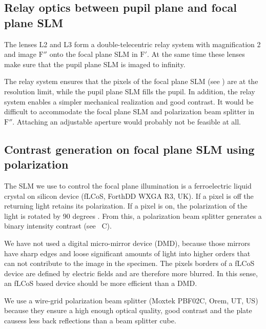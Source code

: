 

\subsection{Relay optics between pupil plane and focal plane SLM}
The lenses L2 and L3 form a double-telecentric relay system with
magnification 2 and image $\textrm{F}''$ onto the focal plane SLM in
$\textrm{F}'$. At the same time these lenses make sure that the pupil
plane SLM is imaged to infinity.
 
The relay system ensures that the pixels of the focal plane SLM (see
) are at the resolution limit, while the pupil
plane SLM fills the pupil.  In addition, the relay system enables a
simpler mechanical realization and good contrast. It would be
difficult to accommodate the focal plane SLM and polarization beam
splitter in $\textrm{F}''$. Attaching an adjustable aperture would
probably not be feasible at all.


\subsection{ Contrast generation on focal plane SLM using
  polarization}
The SLM we use to control the focal plane illumination is a   ferroelectric liquid crystal on silicon device
(fLCoS, ForthDD WXGA R3, UK). If a pixel is off the returning light
retains its polarization. If a pixel is on, the polarization of the
light is rotated by 90 degrees \citep{Martinez-Garcia2009}.  From
this, a polarization beam splitter generates a binary intensity
contrast (see ~C).

We have not used a digital micro-mirror device (DMD), because those
mirrors have sharp edges and loose significant amounts of light into
higher orders that can not contribute to the image in the
specimen. The pixels borders of a fLCoS device are defined by electric
fields and are therefore more blurred. In this sense, an fLCoS based
device should be more efficient than a DMD.

We use a wire-grid polarization beam splitter (Moxtek PBF02C,     
Orem, UT, US) because they ensure a high enough optical quality, good
contrast and the plate causess less back reflections than a beam
splitter cube.




